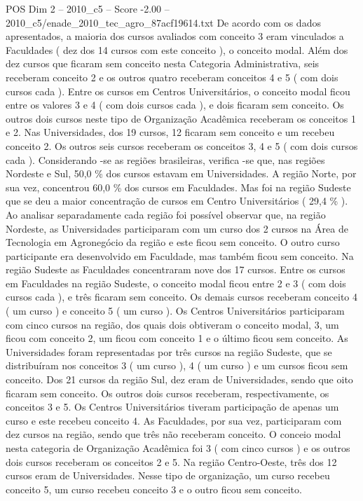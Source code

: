 \begin{textsample}{POS Dim 2 – 2010\_c5 – Score -2.00 – 2010\_c5/enade\_2010\_tec\_agro\_87acf19614.txt}
De acordo com os dados apresentados, a maioria dos cursos avaliados com conceito 3 eram vinculados a Faculdades ( dez dos 14 cursos com este conceito ), o conceito modal.
Além dos dez cursos que ficaram sem conceito nesta Categoria Administrativa, seis receberam conceito 2 e os outros quatro receberam conceitos 4 e 5 ( com dois cursos cada ).
Entre os cursos em Centros Universitários, o conceito modal ficou entre os valores 3 e 4 ( com dois cursos cada ), e dois ficaram sem conceito.
Os outros dois cursos neste tipo de Organização Acadêmica receberam os conceitos 1 e 2.
Nas Universidades, dos 19 cursos, 12 ficaram sem conceito e um recebeu conceito 2.
Os outros seis cursos receberam os conceitos 3, 4 e 5 ( com dois cursos cada ).
Considerando -se as regiões brasileiras, verifica -se que, nas regiões Nordeste e Sul, 50,0 \% dos cursos estavam em Universidades.
A região Norte, por sua vez, concentrou 60,0 \% dos cursos em Faculdades.
Mas foi na região Sudeste que se deu a maior concentração de cursos em Centro Universitários ( 29,4 \% ).
Ao analisar separadamente cada região foi possível observar que, na região Nordeste, as Universidades participaram com um curso dos 2 cursos na Área de Tecnologia em Agronegócio da região e este ficou sem conceito.
O outro curso participante era desenvolvido em Faculdade, mas também ficou sem conceito.
Na região Sudeste as Faculdades concentraram nove dos 17 cursos.
Entre os cursos em Faculdades na região Sudeste, o conceito modal ficou entre 2 e 3 ( com dois cursos cada ), e três ficaram sem conceito.
Os demais cursos receberam conceito 4 ( um curso ) e conceito 5 ( um curso ).
Os Centros Universitários participaram com cinco cursos na região, dos quais dois obtiveram o conceito modal, 3, um ficou com conceito 2, um ficou com conceito 1 e o último ficou sem conceito.
As Universidades foram representadas por três cursos na região Sudeste, que se distribuíram nos conceitos 3 ( um curso ), 4 ( um curso ) e um cursos ficou sem conceito.
Dos 21 cursos da região Sul, dez eram de Universidades, sendo que oito ficaram sem conceito.
Os outros dois cursos receberam, respectivamente, os conceitos 3 e 5.
Os Centros Universitários tiveram participação de apenas um curso e este recebeu conceito 4.
As Faculdades, por sua vez, participaram com dez cursos na região, sendo que três não receberam conceito.
O conceio modal nesta categoria de Organização Acadêmica foi 3 ( com cinco cursos ) e os outros dois cursos receberam os conceitos 2 e 5.
Na região Centro-Oeste, três dos 12 cursos eram de Universidades.
Nesse tipo de organização, um curso recebeu conceito 5, um curso recebeu conceito 3 e o outro ficou sem conceito.

\end{textsample}
